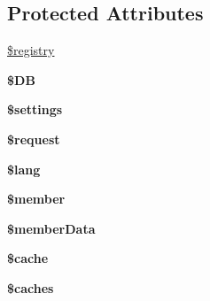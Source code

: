 \subsection*{Protected Attributes}
\begin{DoxyCompactItemize}
\item 
\hyperlink{classadmin__group__form____core_a531e4a386aaa7f3e06d3642dc38d7e80}{\$registry}
\item 
\hypertarget{classadmin__group__form____core_a7dc56dc8b18ad37272b56fa7395bedef}{{\bfseries \$\-D\-B}}\label{classadmin__group__form____core_a7dc56dc8b18ad37272b56fa7395bedef}

\item 
\hypertarget{classadmin__group__form____core_ac7c3353107070daa85f641882931b358}{{\bfseries \$settings}}\label{classadmin__group__form____core_ac7c3353107070daa85f641882931b358}

\item 
\hypertarget{classadmin__group__form____core_abb35c8495a232b510389fa6d7b15d38a}{{\bfseries \$request}}\label{classadmin__group__form____core_abb35c8495a232b510389fa6d7b15d38a}

\item 
\hypertarget{classadmin__group__form____core_a7714b111b644017933931ec69a154102}{{\bfseries \$lang}}\label{classadmin__group__form____core_a7714b111b644017933931ec69a154102}

\item 
\hypertarget{classadmin__group__form____core_a5e1c849c6148a8732eee400fcee0d044}{{\bfseries \$member}}\label{classadmin__group__form____core_a5e1c849c6148a8732eee400fcee0d044}

\item 
\hypertarget{classadmin__group__form____core_ae9d848ba2cf6eee63bdc060e2dfcf95a}{{\bfseries \$member\-Data}}\label{classadmin__group__form____core_ae9d848ba2cf6eee63bdc060e2dfcf95a}

\item 
\hypertarget{classadmin__group__form____core_ac2dc76d756ec398393d4b1d23659276c}{{\bfseries \$cache}}\label{classadmin__group__form____core_ac2dc76d756ec398393d4b1d23659276c}

\item 
\hypertarget{classadmin__group__form____core_a0334a912b7c2d39a9bc71177578d782e}{{\bfseries \$caches}}\label{classadmin__group__form____core_a0334a912b7c2d39a9bc71177578d782e}

\end{DoxyCompactItemize}


